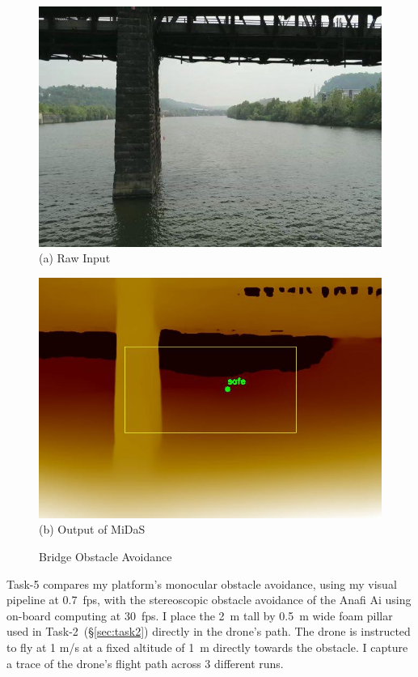 \begin{figure}
\vspace{0.1in}
\begin{minipage}[b]{0.495\linewidth}
\centering
\includegraphics[width=0.95\linewidth]{chapter4/FIGS/fig-bridge-raw.jpg}\\
{\small (a) Raw Input}\\
\end{minipage}
\begin{minipage}[b]{0.495\linewidth}
\centering
\includegraphics[width=0.95\linewidth]{chapter4/FIGS/fig-bridge-midas.jpg}\\
{\small (b) Output of MiDaS}\\
\end{minipage}
\caption{Bridge Obstacle Avoidance}
\label{fig:midas-sample}
\end{figure}

Task-5 compares my platform's monocular obstacle avoidance, using my
visual pipeline at 0.7~fps, with the stereoscopic obstacle avoidance
of the Anafi Ai using on-board computing at 30~fps.  I place the 2~m
tall by 0.5~m wide foam pillar used in Task-2~(\S\ref{sec:task2})
directly in the drone's path. The drone is instructed to fly at 1
m/s at a fixed altitude of 1~m directly towards the obstacle.  I
capture a trace of the drone's flight path across 3 different runs.

